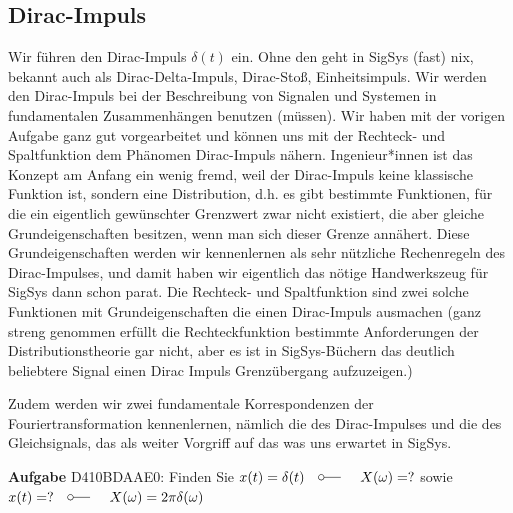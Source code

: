 \cleardoublepage
\subsection{Dirac-Impuls}
\label{sec:D410BDAAE0}
\begin{Ziel}
Wir führen den Dirac-Impuls $\delta(t)$ ein.
Ohne den geht in SigSys (fast) nix, bekannt auch als
Dirac-Delta-Impuls, Dirac-Stoß, Einheitsimpuls.
Wir werden den Dirac-Impuls bei der Beschreibung von Signalen und Systemen
in fundamentalen Zusammenhängen benutzen (müssen).
Wir haben mit der vorigen Aufgabe ganz gut vorgearbeitet und können uns
mit der Rechteck- und Spaltfunktion dem Phänomen Dirac-Impuls nähern.
Ingenieur*innen ist das Konzept am Anfang ein wenig fremd, weil
der Dirac-Impuls keine klassische Funktion ist, sondern eine Distribution, d.h.
es gibt bestimmte Funktionen, für die ein eigentlich gewünschter Grenzwert zwar nicht existiert,
die aber gleiche Grundeigenschaften besitzen, wenn man sich dieser Grenze annähert.
Diese Grundeigenschaften werden wir kennenlernen als sehr nützliche
Rechenregeln des Dirac-Impulses, und damit haben wir eigentlich das nötige
Handwerkszeug für SigSys dann schon parat.
Die Rechteck- und Spaltfunktion sind zwei solche Funktionen mit
Grundeigenschaften die einen Dirac-Impuls ausmachen (ganz streng genommen erfüllt
die Rechteckfunktion bestimmte Anforderungen der Distributionstheorie gar nicht,
aber es ist in SigSys-Büchern das deutlich beliebtere Signal einen Dirac Impuls
Grenzübergang aufzuzeigen.)

Zudem werden wir zwei fundamentale Korrespondenzen der Fouriertransformation
kennenlernen, nämlich die des Dirac-Impulses und die des Gleichsignals, das als
weiter Vorgriff auf das was uns erwartet in SigSys.
\end{Ziel}
\textbf{Aufgabe} {\tiny D410BDAAE0}:
Finden Sie $x(t)=\delta(t)\quad \fourier \quad X(\omega)=?$ sowie
$x(t)= ? \quad \fourier \quad X(\omega)=2\pi \delta(\omega)$

